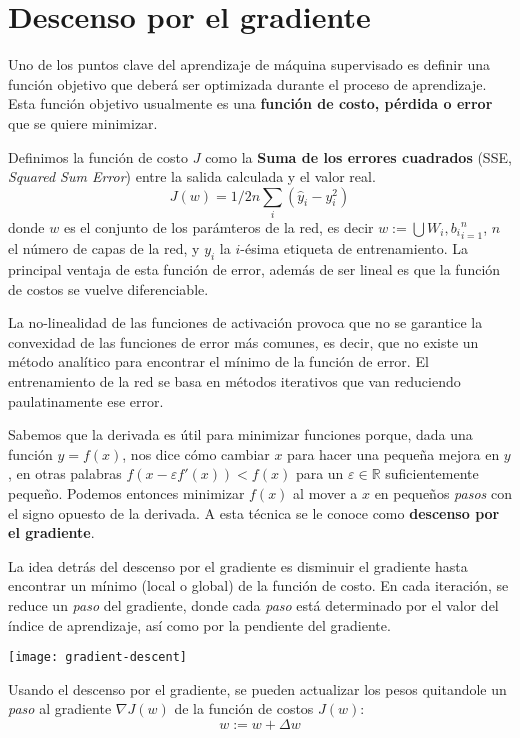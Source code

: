 \section{Descenso por el gradiente}
Uno de los puntos clave del aprendizaje de máquina supervisado es
definir una función objetivo que deberá ser optimizada durante el
proceso de aprendizaje. Esta función objetivo usualmente es una
\textbf{función de costo, pérdida o error} que se quiere minimizar.

Definimos la función de costo $J$ como la \textbf{Suma de los errores
  cuadrados} (SSE, \textit{Squared Sum Error}) entre la salida
  calculada y el valor real.
\begin{equation}
  J(w)=1/2n \sum_i (\hat{y}_i - y_i^2)
\end{equation}
donde $w$ es el conjunto de los parámteros de la red, es decir $w :=
\bigcup{W_i, b_i}_{i=1}^{n}$, $n$ el número de capas de la red, y
$y_i$ la $i$-ésima etiqueta de entrenamiento. La principal ventaja de
esta función de error, además de ser lineal es que la función de
costos se vuelve diferenciable.

La no-linealidad de las funciones de activación provoca que no se
garantice la convexidad de las funciones de error más comunes, es
decir, que no existe un método analítico para encontrar el mínimo de
la función de error. El entrenamiento de la red se basa en métodos
iterativos que van reduciendo paulatinamente ese error.

Sabemos que la derivada es útil para minimizar funciones porque, dada
una función $y = f(x)$, nos dice cómo cambiar $x$ para hacer una
pequeña mejora en $y$, en otras palabras $f(x-\varepsilon f'(x)) <
f(x)$ para un $\varepsilon \in \mathbb{R}$ suficientemente
pequeño. Podemos entonces minimizar $f(x)$ al mover a $x$ en pequeños
\textit{pasos} con el signo opuesto de la derivada. A esta técnica se
le conoce como \textbf{descenso por el gradiente}.

La idea detrás del descenso por el gradiente es disminuir el gradiente hasta encontrar
un mínimo (local o global) de la función de costo. En cada iteración, se reduce
un \textit{paso} del gradiente, donde cada \textit{paso} está determinado por
el valor del índice de aprendizaje, así como por la pendiente del gradiente.

\texttt{[image: gradient-descent]}

Usando el descenso por el gradiente, se pueden actualizar los pesos quitandole un \textit{paso}
al gradiente $\nabla J(w)$ de la función de costos $J(w)$:
\begin{equation}
  w := w + \Delta w
\end{equation}

